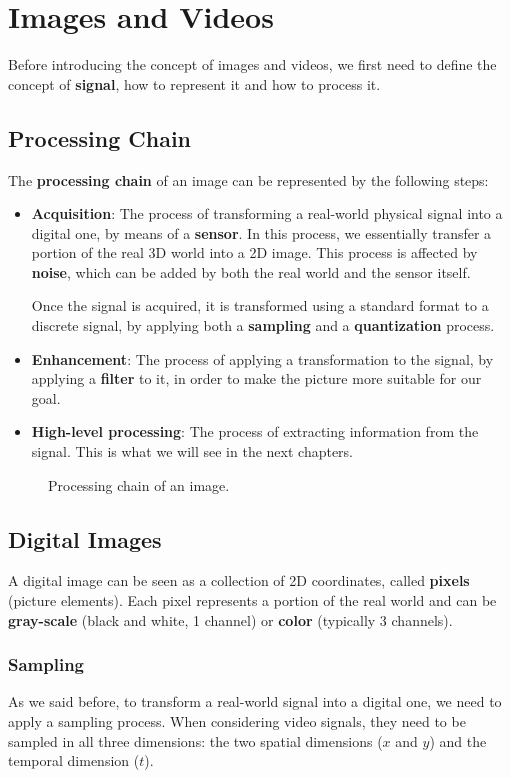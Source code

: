 \section{Images and Videos}
Before introducing the concept of images and videos, we first need to define
the concept of \textbf{signal}, how to represent it and how to process it.

\subsection{Processing Chain}
The \textbf{processing chain} of an image can be represented by the following steps:
\begin{itemize}
    \item \textbf{Acquisition}: The process of transforming a real-world physical signal into
    a digital one, by means of a \textbf{sensor}. In this process, we essentially transfer
    a portion of the real 3D world into a 2D image.
    This process is affected by \textbf{noise}, which can be added by both the real world
    and the sensor itself.

    Once the signal is acquired, it is transformed using a standard format to a discrete signal,
    by applying both a \textbf{sampling} and a \textbf{quantization} process.
    \item \textbf{Enhancement}: The process of applying a transformation to the signal,
    by applying a \textbf{filter} to it, in order to make the picture more suitable for our goal.
    \item \textbf{High-level processing}: The process of extracting information from the signal. This
    is what we will see in the next chapters.
\end{itemize}
\begin{figure}[H]
    \centering
    \scalebox{0.8}{
        
    }
    \caption{Processing chain of an image.}
\end{figure}

\subsection{Digital Images}
A digital image can be seen as a collection of 2D coordinates, called \textbf{pixels} (picture elements).
Each pixel represents a portion of the real world and can be \textbf{gray-scale} (black and white, 1 channel) or \textbf{color} (typically 3 channels).

\subsubsection{Sampling}
As we said before, to transform a real-world signal into a digital one, we need to apply a sampling process.
When considering video signals, they need to be sampled in all three dimensions: the two spatial dimensions ($x$ and $y$) and the temporal dimension ($t$).

